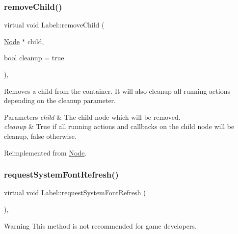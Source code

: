 \subsubsection{\texorpdfstring{remove\+Child()}{removeChild()}\hspace{0.1cm}{\footnotesize\ttfamily [2/2]}}
{\footnotesize\ttfamily virtual void Label\+::remove\+Child (\begin{DoxyParamCaption}\item[{\hyperlink{classNode}{Node} $\ast$}]{child,  }\item[{bool}]{cleanup = {\ttfamily true} }\end{DoxyParamCaption})\hspace{0.3cm}{\ttfamily [override]}, {\ttfamily [virtual]}}

Removes a child from the container. It will also cleanup all running actions depending on the cleanup parameter.


\begin{DoxyParams}{Parameters}
{\em child} & The child node which will be removed. \\
\hline
{\em cleanup} & True if all running actions and callbacks on the child node will be cleanup, false otherwise. \\
\hline
\end{DoxyParams}


Reimplemented from \hyperlink{classNode_a872d4a7d389b26b0c6ad7ed99c8b1b65}{Node}.

\mbox{\label{classLabel_adf22772294ad56788486046beca0656f}} 
\subsubsection{\texorpdfstring{request\+System\+Font\+Refresh()}{requestSystemFontRefresh()}\hspace{0.1cm}{\footnotesize\ttfamily [1/2]}}
{\footnotesize\ttfamily virtual void Label\+::request\+System\+Font\+Refresh (\begin{DoxyParamCaption}{ }\end{DoxyParamCaption})\hspace{0.3cm}{\ttfamily [inline]}, {\ttfamily [virtual]}}

\begin{DoxyWarning}{Warning}
This method is not recommended for game developers. 
\end{DoxyWarning}
\mbox{\label{classLabel_adf22772294ad56788486046beca0656f}} 
